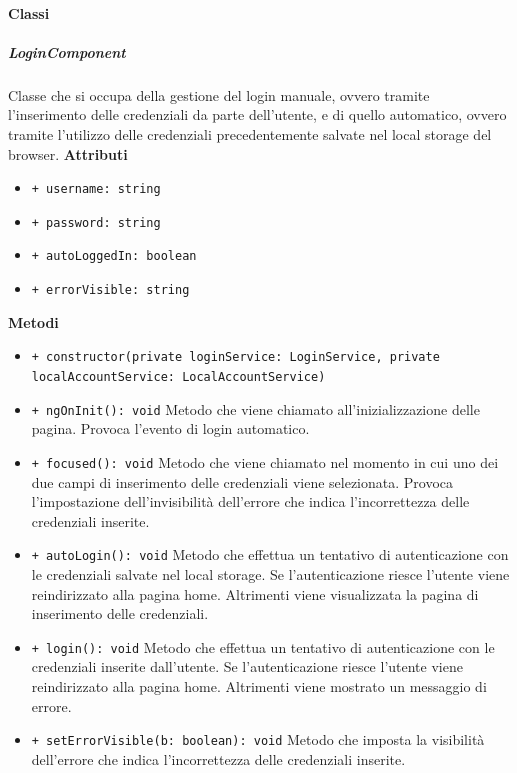 \paragraph{Classi}

\subparagraph{LoginComponent}
Classe che si occupa della gestione del login manuale, ovvero tramite l'inserimento delle credenziali da parte dell'utente, e di quello automatico, ovvero tramite l'utilizzo delle credenziali precedentemente salvate nel local storage del browser. \newline
\textbf{Attributi}
\begin{itemize}
	\item \texttt{+ username: string}
	\item \texttt{+ password: string}
	\item \texttt{+ autoLoggedIn: boolean}
	\item \texttt{+ errorVisible: string}
\end{itemize}
\textbf{Metodi}
\begin{itemize}
	\item \texttt{+ constructor(private loginService: LoginService, private localAccountService: LocalAccountService)}
	\item \texttt{+ ngOnInit(): void} \newline
	Metodo che viene chiamato all'inizializzazione delle pagina. Provoca l'evento di login automatico.
	\item \texttt{+ focused(): void} \newline
	Metodo che viene chiamato nel momento in cui uno dei due campi di inserimento delle credenziali viene selezionata. Provoca l'impostazione dell'invisibilità dell'errore che indica l'incorrettezza delle credenziali inserite.
	\item \texttt{+ autoLogin(): void} \newline
	Metodo che effettua un tentativo di autenticazione con le credenziali salvate nel local storage. Se l'autenticazione riesce l'utente viene reindirizzato alla pagina home. Altrimenti viene visualizzata la pagina di inserimento delle credenziali.
	\item \texttt{+ login(): void} \newline
	Metodo che effettua un tentativo di autenticazione con le credenziali inserite dall'utente. Se l'autenticazione riesce l'utente viene reindirizzato alla pagina home. Altrimenti viene mostrato un messaggio di errore.
	\item \texttt{+ setErrorVisible(b: boolean): void} \newline
	Metodo che imposta la visibilità dell'errore che indica l'incorrettezza delle credenziali inserite.
\end{itemize}
